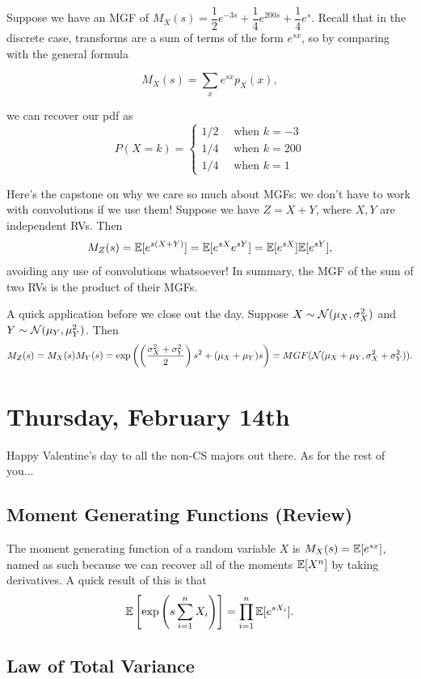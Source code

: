 \documentclass[11 pt]{scrartcl}
\begin{document}
\begin{example}
    Suppose we have an MGF of $M_X(s) = \dfrac{1}{2}e^{-3s} + \dfrac{1}{4}e^{200s} + \dfrac{1}{4}e^s$. Recall that in the discrete case, transforms are a sum of terms of the form $e^{sx}$, so by comparing with the general formula 
  
    \[ M_X(s) = \sum_x e^{sx} p_X(x), \]

    we can recover our pdf as 
    \[ P(X = k) = \begin{cases}  
                    1/2 \quad \text{ when } k = -3 \\ 
                    1/4 \quad \text{ when } k = 200 \\ 
                    1/4 \quad \text{ when } k = 1 
            \end{cases} \] 
\end{example}

Here's the capstone on why we care so much about MGFs: we don't have to work with convolutions if we use them! Suppose we have $Z = X+Y$, where $X,Y$ are independent RVs. Then 
\[ M_Z(s) = \mathbb E[e^{s(X+Y)}] = \mathbb E[e^{sX}e^{sY}] = \mathbb E[e^{sX}]\mathbb E[e^{sY}],\]
avoiding any use of convolutions whatsoever! In summary, the MGF of the sum of two RVs is the product of their MGFs.

A quick application before we close out the day. Suppose $X\sim\mathcal{N}(\mu_X, \sigma_X^2)$ and $Y\sim\mathcal{N}(\mu_Y, \mu_Y^2)$. Then 
\[ M_Z(s) = M_X(s)M_Y(s) = \exp\left( \left(\dfrac{\sigma_X^2+\sigma_Y^2}{2}\right)s^2 + (\mu_X + \mu_Y)s \right) = MGF(\mathcal{N}(\mu_X+\mu_Y, \sigma_X^2+\sigma_Y^2)).\] 

\newpage
\section{Thursday, February 14th}
Happy Valentine's day to all the non-CS majors out there. As for the rest of you... 

\subsection{Moment Generating Functions (Review)}
The moment generating function of a random variable $X$ is $M_X(s) = \mathbb E[e^{sx}]$, named as such because we can recover all of the moments $\mathbb E[X^n]$ by taking derivatives. A quick result of this is that 
\[ \mathbb E\left[\exp\left(s\sum_{i=1}^n X_i\right)\right] = \prod_{i=1}^n \mathbb E[e^{sX_i}].\]

\subsection{Law of Total Variance}
 
\end{document}
